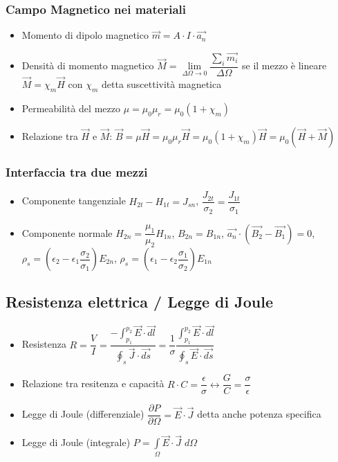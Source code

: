 \documentclass{article}
\begin{document}
\subsubsection{Campo Magnetico nei materiali}
\begin{itemize}
	\item Momento di dipolo magnetico \( \vec{m} = A \cdot I \cdot \vec{a_n} \)
	\item Densità di momento magnetico \(\vec{M} = \lim\limits_{\Delta\Omega \rightarrow 0} \dfrac{\sum_i \vec{m_i}}{\Delta\Omega}\) se il mezzo è lineare \( \vec{M} = \chi_m \vec{H} \) con \(\chi_m\) detta suscettività magnetica
	\item Permeabilità del mezzo \( \mu = \mu_0 \mu_r = \mu_0 (1 + \chi_m) \)
	\item Relazione tra \( \vec{H} \) e \( \vec{M} \): \( \vec{B} = \mu \vec{H} = \mu_0 \mu_r \vec{H} = \mu_0 (1 + \chi_m) \vec{H} = \mu_0 (\vec{H} + \vec{M}) \)
\end{itemize}



\subsubsection{Interfaccia tra due mezzi}
\begin{itemize}
	\item Componente tangenziale \( H_{2t} - H_{1t} = J_{sn} \), \( \dfrac{J_{2t}}{\sigma_2} = \dfrac{J_{1t}}{\sigma_1} \)
	\item Componente normale \( H_{2n} = \dfrac{\mu_1}{\mu_2} H_{1n} \), \(B_{2n} = B_{1n}\), \( \vec{a_n} \cdot \left(\vec{B_2} - \vec{B_1} \right) = 0 \), \( \rho_s = \left( \epsilon_2 - \epsilon_1 \dfrac{\sigma_2}{\sigma_1} \right) E_{2n} \),  \( \rho_s = \left( \epsilon_1 - \epsilon_2 \dfrac{\sigma_1}{\sigma_2} \right) E_{1n} \)
\end{itemize}

\subsection{Resistenza elettrica / Legge di Joule}
\begin{itemize}
	\item Resistenza \(\displaystyle  R = \dfrac{V}{I} = \dfrac{\displaystyle-\int_{p_1}^{p_2} \vec{E} \cdot \vec{dl}}{\displaystyle\oint_s \vec{J} \cdot \vec{ds}} = \dfrac{1}{\sigma} \dfrac{\displaystyle\int_{p_1}^{p_2} \vec{E} \cdot \vec{dl}}{\displaystyle \oint_s \vec{E} \cdot \vec{ds}} \)
	\item Relazione tra resitenza e capacità \(R \cdot C = \dfrac{\epsilon}{\sigma} \leftrightarrow \dfrac{G}{C} = \dfrac{\sigma}{\epsilon} \)
	\item Legge di Joule (differenziale) \( \dfrac{\partial P}{\partial \Omega} = \vec{E} \cdot \vec{J} \) detta anche potenza specifica
	\item Legge di Joule (integrale) \(\displaystyle P = \int\limits_\Omega \vec{E} \cdot \vec{J} \; d\Omega \)
\end{itemize}
\end{document}

